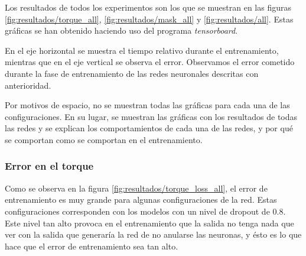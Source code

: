 Los resultados de todos los experimentos son los que se muestran en las figuras \ref{fig:resultados/torque_all}, \ref{fig:resultados/mask_all} y \ref{fig:resultados/all}. Estas gráficas se han obtenido haciendo uso del programa \textit{tensorboard}.

En el eje horizontal se muestra el tiempo relativo durante el entrenamiento, mientras que en el eje vertical se observa el error. Observamos el error cometido durante la fase de entrenamiento de las redes neuronales descritas con anterioridad.

Por motivos de espacio, no se muestran todas las gráficas para cada una de las configuraciones. En su lugar, se muestran las gráficas con los resultados de todas las redes y se explican los comportamientos de cada una de las redes, y por qué se comportan como se comportan en el entrenamiento.

\subsubsection{Error en el torque}
Como se observa en la figura \ref{fig:resultados/torque_loss_all}, el error de entrenamiento es muy grande para algunas configuraciones de la red. Estas configuraciones corresponden con los modelos con un nivel de dropout de 0.8. Este nivel tan alto provoca en el entrenamiento que la salida no tenga nada que ver con la salida que generaría la red de no anularse las neuronas, y ésto es lo que hace que el error de entrenamiento sea tan alto.

